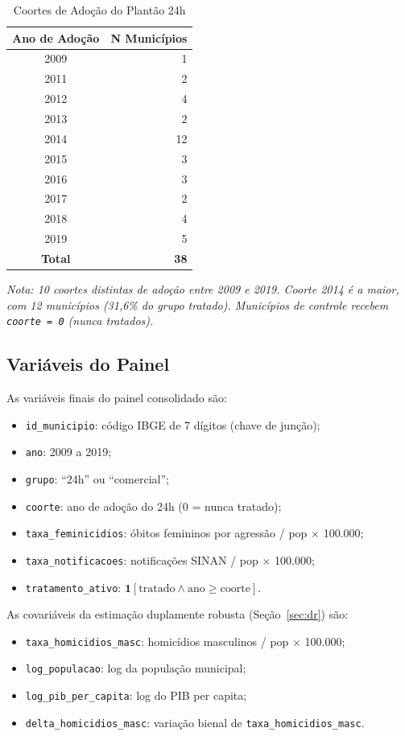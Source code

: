 \documentclass[twocolumn, 10pt]{article}
\begin{document}
\begin{table}[H]
\centering
\caption{Coortes de Adoção do Plantão 24h}
\label{tab:coortes}
\small
\begin{tabular}{@{}cr@{}}
\toprule
\textbf{Ano de Adoção} & \textbf{N Municípios} \\
\midrule
2009 & 1  \\
2011 & 2  \\
2012 & 4  \\
2013 & 2  \\
2014 & 12 \\
2015 & 3  \\
2016 & 3  \\
2017 & 2  \\
2018 & 4  \\
2019 & 5  \\
\midrule
\textbf{Total} & \textbf{38} \\
\bottomrule
\end{tabular}
\smallskip\par
{\footnotesize\sffamily\itshape
Nota: 10 coortes distintas de adoção entre 2009 e 2019.
Coorte 2014 é a maior, com 12 municípios (31,6\% do grupo tratado).
Municípios de controle recebem \texttt{coorte = 0} (nunca tratados).}
\end{table}

\subsection{Variáveis do Painel}

As variáveis finais do painel consolidado são:
\begin{itemize}
  \item \texttt{id\_municipio}: código IBGE de 7 dígitos (chave de junção);
  \item \texttt{ano}: 2009 a 2019;
  \item \texttt{grupo}: ``24h'' ou ``comercial'';
  \item \texttt{coorte}: ano de adoção do 24h (0 = nunca tratado);
  \item \texttt{taxa\_feminicidios}: óbitos femininos por agressão / pop $\times$ 100.000;
  \item \texttt{taxa\_notificacoes}: notificações SINAN / pop $\times$ 100.000;
  \item \texttt{tratamento\_ativo}: $\mathbf{1}[\text{tratado} \wedge \text{ano} \geq \text{coorte}]$.
\end{itemize}

\noindent As covariáveis da estimação duplamente robusta (Seção~\ref{sec:dr}) são:
\begin{itemize}
  \item \texttt{taxa\_homicidios\_masc}: homicídios masculinos / pop $\times$ 100.000;
  \item \texttt{log\_populacao}: log da população municipal;
  \item \texttt{log\_pib\_per\_capita}: log do PIB per capita;
  \item \texttt{delta\_homicidios\_masc}: variação bienal de \texttt{taxa\_homicidios\_masc}.
\end{itemize}
\end{document}
